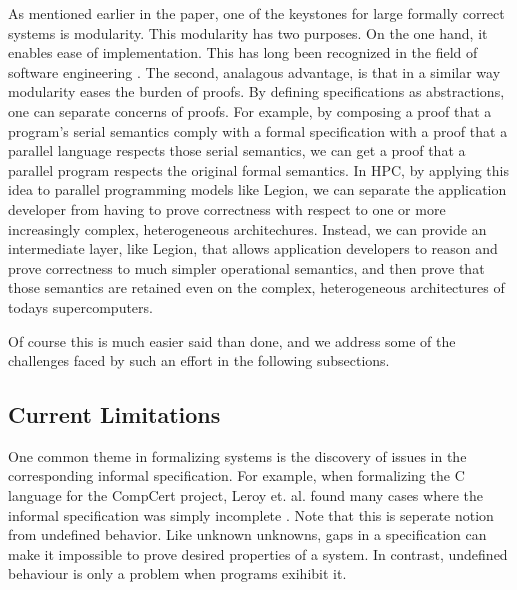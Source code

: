 \documentclass[sigconf]{acmart}
\begin{document}
As mentioned earlier in the paper, one of the keystones for large formally
correct systems is modularity. This modularity has two purposes. On the one
hand, it enables ease of implementation. This has long been recognized 
in the field of software engineering \cite{?}. The second, analagous advantage,
is that in a similar way modularity eases the burden of proofs. By defining 
specifications as abstractions, one can separate concerns of proofs. For example,
by composing a proof that a program's serial semantics comply with a formal
specification with a proof that a parallel language respects those serial 
semantics, we can get a proof that a parallel program respects the original
formal semantics. In HPC, by applying this idea to parallel programming models like
Legion, we can separate the application developer from having to prove 
correctness with respect to one or more increasingly complex, heterogeneous
architechures. Instead, we can provide an intermediate layer, like Legion, that
allows application developers to reason and prove correctness to much 
simpler operational semantics, and then prove that those semantics are retained
even on the complex, heterogeneous architectures of todays supercomputers.

Of course this is much easier said than done, and we address some of the challenges
faced by such an effort in the following subsections.

\subsection{Current Limitations}

One common theme in formalizing systems is the discovery of issues in the
corresponding informal specification. For example, when formalizing the C
language for the CompCert project, Leroy et. al. found many cases where the
informal specification was simply incomplete \cite{compcert}. Note that this is
seperate notion from undefined behavior. Like unknown unknowns, gaps in a
specification can make it impossible to prove desired properties of a system.
In contrast, undefined behaviour is only a problem when programs exihibit it.
\end{document}
